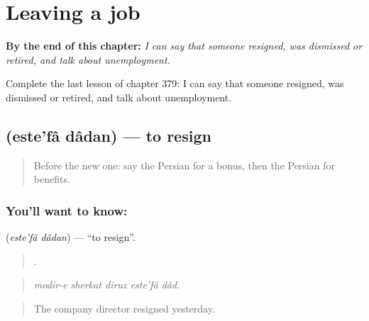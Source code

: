 
\chapter{Leaving a job}
\label{ch:fa-leaving-a-job}

\begin{chapteropening}
\textbf{By the end of this chapter:} \emph{I can say that someone resigned, was dismissed or retired, and talk about unemployment.}

Complete the last lesson of chapter 379: I can say that someone resigned, was dismissed or retired, and talk about unemployment.
\end{chapteropening}

\section[\texorpdfstring{\fa{استعفا} \fa{دادن} (este'fâ dâdan)}{استعفا دادن (este'fâ dâdan)}]{  (este'fâ dâdan) — to resign}

\label{lesson:FA-C379-estefa-dadan}



\begin{quote}
Before the new one: say the Persian for a bonus, then the Persian for benefits.
\end{quote}

\subsection*{You'll want to know:  }
\textbf{ } (\emph{este'fâ dâdan}) — \textquotedblleft{}to resign\textquotedblright{}.

\begin{quote}
    .
\end{quote}

\begin{quote}
\emph{modir-e sherkat diruz este'fâ dâd.}
\end{quote}

\begin{quote}
The company director resigned yesterday.
\end{quote}

